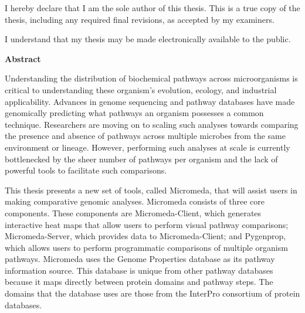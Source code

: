 \cleardoublepage %

  \noindent
I hereby declare that I am the sole author of this thesis. This is a true copy of the thesis, including any required final revisions, as accepted by my examiners.

  \bigskip
  
  \noindent
I understand that my thesis may be made electronically available to the public.

\cleardoublepage


\begin{center}\textbf{Abstract}\end{center}

Understanding the distribution of biochemical pathways across microorganisms is 
critical to understanding these organism's evolution, ecology, and industrial 
applicability. Advances in genome sequencing and pathway databases have made 
genomically predicting what pathways an organism possesses a common technique. 
Researchers are moving on to scaling such analyses towards comparing the 
presence and absence of pathways across multiple microbes from the same 
environment or lineage. However, performing such analyses at scale is currently 
bottlenecked by the sheer number of pathways per organism and the lack of 
powerful tools to facilitate such comparisons. 

This thesis presents a new set of tools, called Micromeda, that will assist 
users in making comparative genomic analyses. Micromeda consists of three core 
components. These components are Micromeda-Client, which generates interactive 
heat maps that allow users to perform visual pathway comparisons; 
Micromeda-Server, which provides data to Micromeda-Client; and Pygenprop, which 
allows users to perform programmatic comparisons of multiple organism pathways. 
Micromeda uses the Genome Properties database as its pathway information source. 
This database is unique from other pathway databases because it maps directly 
between protein domains and pathway steps. The domains that the database uses 
are those from the InterPro consortium of protein databases. 


